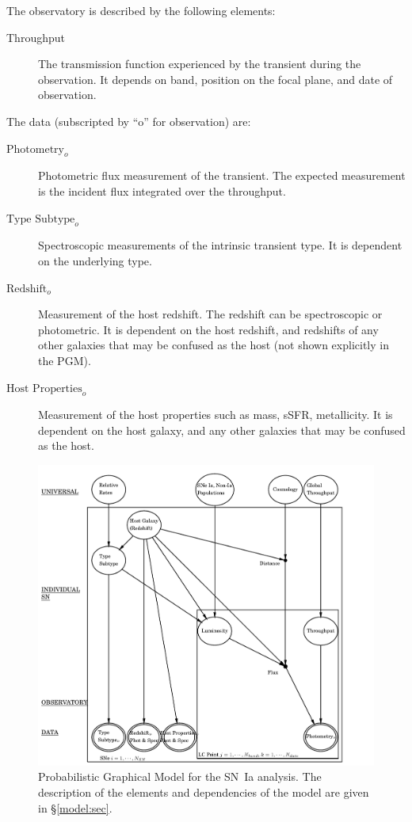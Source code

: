 \documentclass[preprint,3p]{elsarticle}
\begin{document}
The observatory is described by the following elements:
\begin{description}
\item[Throughput] The transmission function experienced by the transient during
the observation.  It depends on band, position on the focal plane, and date of observation.
\end{description}
The data (subscripted by ``o'' for observation)  are:
\begin{description}
\item[$\text{Photometry}_o$] Photometric flux measurement of the transient.
The expected measurement
is the incident flux integrated over the throughput.
\item[$\text{Type Subtype}_o$] Spectroscopic
measurements of the intrinsic transient type.  It is dependent on the underlying
type.
\item[$\text{Redshift}_o$] Measurement of the host redshift.  The redshift can be
spectroscopic or photometric.  It is dependent on the host redshift, and
redshifts of any other galaxies that may be confused as the host (not shown explicitly
in the PGM).
\item[$\text{Host Properties}_o$] Measurement of the host properties such
as mass, sSFR, metallicity. It is dependent on the host galaxy, and
any other galaxies that may be confused as the host.
\end{description}


\begin{figure}[htbp] %
   \centering
   \includegraphics[width=6.5in]{../results/hdpgm.pdf} 
   \caption{Probabilistic Graphical Model for the SN~Ia analysis.  
   The description of the elements and dependencies of the model are given in
   \S\ref{model:sec}.
   \label{pgm:fig}}
\end{figure}
\end{document}
